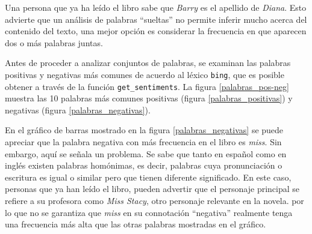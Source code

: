 \documentclass[12pt]{article}
\begin{document}
	Una persona que ya ha leído el libro sabe que \textit{Barry} es el apellido de \textit{Diana}. Esto advierte que un análisis de palabras ``sueltas'' no permite inferir mucho acerca del contenido del texto, una mejor opción es considerar la frecuencia en que aparecen dos o más palabras juntas.
	
	Antes de proceder a analizar conjuntos de palabras, se examinan las palabras positivas y negativas más comunes de acuerdo al léxico \texttt{bing}, que es posible obtener a través de la función \texttt{get\_sentiments}. La figura \ref{palabras_pos-neg} muestra las 10 palabras más comunes positivas (figura \ref{palabras_positivas}) y negativas (figura \ref{palabras_negativas}). 
	
	En el gráfico de barras mostrado en la figura \ref{palabras_negativas} se puede apreciar que la palabra negativa con más frecuencia en el libro es \textit{miss}. Sin embargo, aquí se señala un problema. Se sabe que tanto en español como en inglés existen palabras homónimas, es decir, palabras cuya pronunciación o escritura es igual o similar pero que tienen diferente significado. En este caso, personas que ya han leído el libro, pueden advertir que el personaje principal se refiere a su profesora como \textit{Miss Stacy}, otro personaje relevante en la novela. por lo que no se garantiza que \textit{miss} en su connotación ``negativa'' realmente tenga una frecuencia más alta que las otras palabras mostradas en el gráfico.
	
\end{document}
